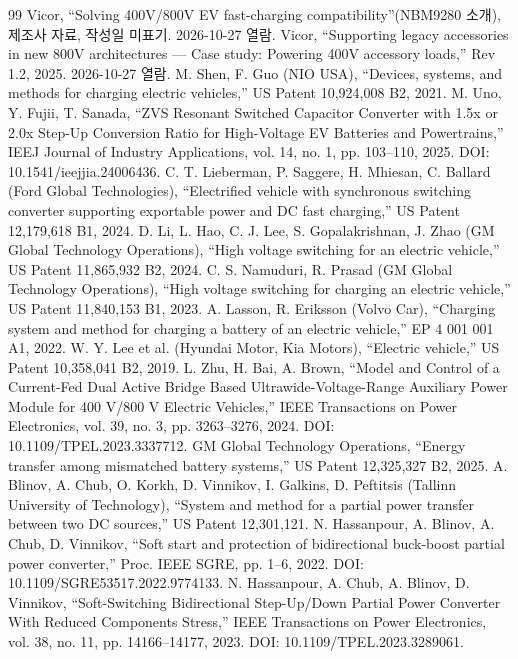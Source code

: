 \begin{thebibliography}{99}
 Vicor, “Solving 400V/800V EV fast-charging compatibility”(NBM9280 소개), 제조사 자료, 작성일 미표기. 2026-10-27 열람.
 Vicor, “Supporting legacy accessories in new 800V architectures — Case study: Powering 400V accessory loads,” Rev 1.2, 2025. 2026-10-27 열람.
 M. Shen, F. Guo (NIO USA), “Devices, systems, and methods for charging electric vehicles,” US Patent 10,924,008 B2, 2021.
 M. Uno, Y. Fujii, T. Sanada, “ZVS Resonant Switched Capacitor Converter with 1.5x or 2.0x Step-Up Conversion Ratio for High-Voltage EV Batteries and Powertrains,” IEEJ Journal of Industry Applications, vol. 14, no. 1, pp. 103–110, 2025. DOI: 10.1541/ieejjia.24006436.
 C. T. Lieberman, P. Saggere, H. Mhiesan, C. Ballard (Ford Global Technologies), “Electrified vehicle with synchronous switching converter supporting exportable power and DC fast charging,” US Patent 12,179,618 B1, 2024.
 D. Li, L. Hao, C. J. Lee, S. Gopalakrishnan, J. Zhao (GM Global Technology Operations), “High voltage switching for an electric vehicle,” US Patent 11,865,932 B2, 2024.
 C. S. Namuduri, R. Prasad (GM Global Technology Operations), “High voltage switching for charging an electric vehicle,” US Patent 11,840,153 B1, 2023.
 A. Lasson, R. Eriksson (Volvo Car), “Charging system and method for charging a battery of an electric vehicle,” EP 4 001 001 A1, 2022.
 W. Y. Lee et al. (Hyundai Motor, Kia Motors), “Electric vehicle,” US Patent 10,358,041 B2, 2019.
 L. Zhu, H. Bai, A. Brown, “Model and Control of a Current-Fed Dual Active Bridge Based Ultrawide-Voltage-Range Auxiliary Power Module for 400 V/800 V Electric Vehicles,” IEEE Transactions on Power Electronics, vol. 39, no. 3, pp. 3263–3276, 2024. DOI: 10.1109/TPEL.2023.3337712.
 GM Global Technology Operations, “Energy transfer among mismatched battery systems,” US Patent 12,325,327 B2, 2025.
 A. Blinov, A. Chub, O. Korkh, D. Vinnikov, I. Galkins, D. Peftitsis (Tallinn University of Technology), “System and method for a partial power transfer between two DC sources,” US Patent 12,301,121.
 N. Hassanpour, A. Blinov, A. Chub, D. Vinnikov, “Soft start and protection of bidirectional buck-boost partial power converter,” Proc. IEEE SGRE, pp. 1–6, 2022. DOI: 10.1109/SGRE53517.2022.9774133.
 N. Hassanpour, A. Chub, A. Blinov, D. Vinnikov, “Soft-Switching Bidirectional Step-Up/Down Partial Power Converter With Reduced Components Stress,” IEEE Transactions on Power Electronics, vol. 38, no. 11, pp. 14166–14177, 2023. DOI: 10.1109/TPEL.2023.3289061.

\end{thebibliography}
